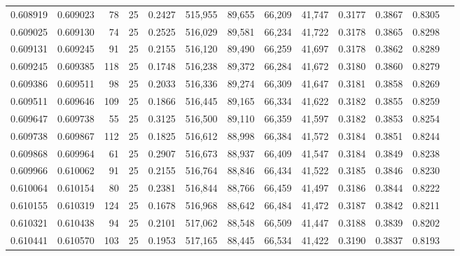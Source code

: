 \begin{tabular}{rrrrrrrrrrrrr}
0.608919 & 0.609023 &    78 &  25 &                                     0.2427 & 515,955 &  89,655 &  66,209 &  41,747 & 0.3177 & 0.3867 & 0.8305 \\
0.609025 & 0.609130 &    74 &  25 &                                     0.2525 & 516,029 &  89,581 &  66,234 &  41,722 & 0.3178 & 0.3865 & 0.8298 \\
0.609131 & 0.609245 &    91 &  25 &                                     0.2155 & 516,120 &  89,490 &  66,259 &  41,697 & 0.3178 & 0.3862 & 0.8289 \\
0.609245 & 0.609385 &   118 &  25 &                                     0.1748 & 516,238 &  89,372 &  66,284 &  41,672 & 0.3180 & 0.3860 & 0.8279 \\
0.609386 & 0.609511 &    98 &  25 &                                     0.2033 & 516,336 &  89,274 &  66,309 &  41,647 & 0.3181 & 0.3858 & 0.8269 \\
0.609511 & 0.609646 &   109 &  25 &                                     0.1866 & 516,445 &  89,165 &  66,334 &  41,622 & 0.3182 & 0.3855 & 0.8259 \\
0.609647 & 0.609738 &    55 &  25 &                                     0.3125 & 516,500 &  89,110 &  66,359 &  41,597 & 0.3182 & 0.3853 & 0.8254 \\
0.609738 & 0.609867 &   112 &  25 &                                     0.1825 & 516,612 &  88,998 &  66,384 &  41,572 & 0.3184 & 0.3851 & 0.8244 \\
0.609868 & 0.609964 &    61 &  25 &                                     0.2907 & 516,673 &  88,937 &  66,409 &  41,547 & 0.3184 & 0.3849 & 0.8238 \\
0.609966 & 0.610062 &    91 &  25 &                                     0.2155 & 516,764 &  88,846 &  66,434 &  41,522 & 0.3185 & 0.3846 & 0.8230 \\
0.610064 & 0.610154 &    80 &  25 &                                     0.2381 & 516,844 &  88,766 &  66,459 &  41,497 & 0.3186 & 0.3844 & 0.8222 \\
0.610155 & 0.610319 &   124 &  25 &                                     0.1678 & 516,968 &  88,642 &  66,484 &  41,472 & 0.3187 & 0.3842 & 0.8211 \\
0.610321 & 0.610438 &    94 &  25 &                                     0.2101 & 517,062 &  88,548 &  66,509 &  41,447 & 0.3188 & 0.3839 & 0.8202 \\
0.610441 & 0.610570 &   103 &  25 &                                     0.1953 & 517,165 &  88,445 &  66,534 &  41,422 & 0.3190 & 0.3837 & 0.8193 \\

\end{tabular}
